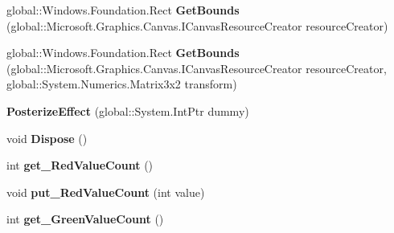 \begin{DoxyCompactItemize}
\item 
\mbox{\label{class_microsoft_1_1_graphics_1_1_canvas_1_1_effects_1_1_posterize_effect_a780eb4ebaf96658240c725e269e4d9ec}} 
global\+::\+Windows.\+Foundation.\+Rect {\bfseries Get\+Bounds} (global\+::\+Microsoft.\+Graphics.\+Canvas.\+I\+Canvas\+Resource\+Creator resource\+Creator)
\item 
\mbox{\label{class_microsoft_1_1_graphics_1_1_canvas_1_1_effects_1_1_posterize_effect_a4ee2f237bc1b5167fcc5df95e29965cc}} 
global\+::\+Windows.\+Foundation.\+Rect {\bfseries Get\+Bounds} (global\+::\+Microsoft.\+Graphics.\+Canvas.\+I\+Canvas\+Resource\+Creator resource\+Creator, global\+::\+System.\+Numerics.\+Matrix3x2 transform)
\item 
\mbox{\label{class_microsoft_1_1_graphics_1_1_canvas_1_1_effects_1_1_posterize_effect_adb521c0c91dea5df611cb2166a550e59}} 
{\bfseries Posterize\+Effect} (global\+::\+System.\+Int\+Ptr dummy)
\item 
\mbox{\label{class_microsoft_1_1_graphics_1_1_canvas_1_1_effects_1_1_posterize_effect_a40d8d73e8cddc900834ed4ad7b805aec}} 
void {\bfseries Dispose} ()
\item 
\mbox{\label{class_microsoft_1_1_graphics_1_1_canvas_1_1_effects_1_1_posterize_effect_a602ceae4471fd91cd66201de4785677b}} 
int {\bfseries get\+\_\+\+Red\+Value\+Count} ()
\item 
\mbox{\label{class_microsoft_1_1_graphics_1_1_canvas_1_1_effects_1_1_posterize_effect_aedb44c1ff4ff1728164cfd3d30d80614}} 
void {\bfseries put\+\_\+\+Red\+Value\+Count} (int value)
\item 
\mbox{\label{class_microsoft_1_1_graphics_1_1_canvas_1_1_effects_1_1_posterize_effect_a7ae044e335cee042586d9c3f8c1a8d57}} 
int {\bfseries get\+\_\+\+Green\+Value\+Count} ()

\end{DoxyCompactItemize}
